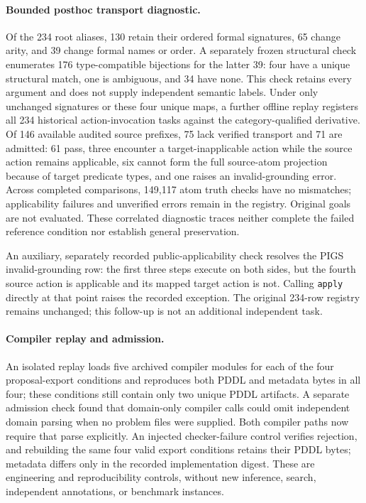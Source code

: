 \documentclass[letterpaper]{article}
\begin{document}
\paragraph{Bounded posthoc transport diagnostic.}
Of the 234 root aliases, 130 retain their ordered formal signatures, 65 change arity, and 39 change formal names or order. A separately frozen structural check enumerates 176 type-compatible bijections for the latter 39: four have a unique structural match, one is ambiguous, and 34 have none. This check retains every argument and does not supply independent semantic labels. Under only unchanged signatures or these four unique maps, a further offline replay registers all 234 historical action-invocation tasks against the category-qualified derivative. Of 146 available audited source prefixes, 75 lack verified transport and 71 are admitted: 61 pass, three encounter a target-inapplicable action while the source action remains applicable, six cannot form the full source-atom projection because of target predicate types, and one raises an invalid-grounding error. Across completed comparisons, 149,117 atom truth checks have no mismatches; applicability failures and unverified errors remain in the registry. Original goals are not evaluated. These correlated diagnostic traces neither complete the failed reference condition nor establish general preservation.

An auxiliary, separately recorded public-applicability check resolves the PIGS invalid-grounding row: the first three steps execute on both sides, but the fourth source action is applicable and its mapped target action is not. Calling \texttt{apply} directly at that point raises the recorded exception. The original 234-row registry remains unchanged; this follow-up is not an additional independent task.

\paragraph{Compiler replay and admission.}
An isolated replay loads five archived compiler modules for each of the four proposal-export conditions and reproduces both PDDL and metadata bytes in all four; these conditions still contain only two unique PDDL artifacts. A separate admission check found that domain-only compiler calls could omit independent domain parsing when no problem files were supplied. Both compiler paths now require that parse explicitly. An injected checker-failure control verifies rejection, and rebuilding the same four valid export conditions retains their PDDL bytes; metadata differs only in the recorded implementation digest. These are engineering and reproducibility controls, without new inference, search, independent annotations, or benchmark instances.
\end{document}
